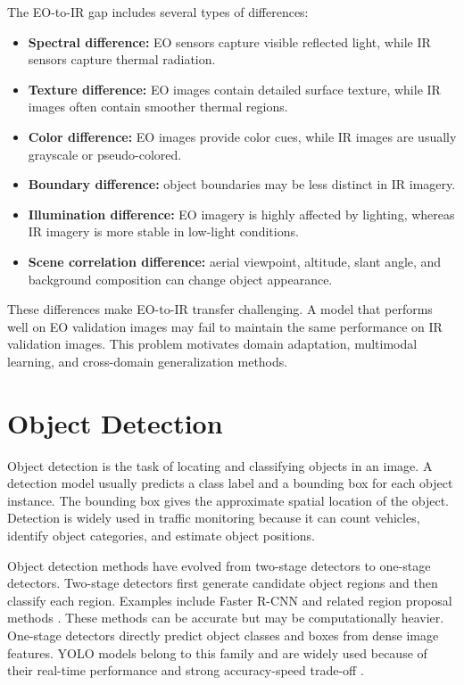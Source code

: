 The EO-to-IR gap includes several types of differences:

\begin{itemize}
    \item \textbf{Spectral difference:} EO sensors capture visible reflected light, while IR sensors capture thermal radiation.
    \item \textbf{Texture difference:} EO images contain detailed surface texture, while IR images often contain smoother thermal regions.
    \item \textbf{Color difference:} EO images provide color cues, while IR images are usually grayscale or pseudo-colored.
    \item \textbf{Boundary difference:} object boundaries may be less distinct in IR imagery.
    \item \textbf{Illumination difference:} EO imagery is highly affected by lighting, whereas IR imagery is more stable in low-light conditions.
    \item \textbf{Scene correlation difference:} aerial viewpoint, altitude, slant angle, and background composition can change object appearance.
\end{itemize}

These differences make EO-to-IR transfer challenging. A model that performs well on EO validation images may fail to maintain the same performance on IR validation images. This problem motivates domain adaptation, multimodal learning, and cross-domain generalization methods.

\section{Object Detection}

Object detection is the task of locating and classifying objects in an image. A detection model usually predicts a class label and a bounding box for each object instance. The bounding box gives the approximate spatial location of the object. Detection is widely used in traffic monitoring because it can count vehicles, identify object categories, and estimate object positions.

Object detection methods have evolved from two-stage detectors to one-stage detectors. Two-stage detectors first generate candidate object regions and then classify each region. Examples include Faster R-CNN and related region proposal methods \cite{fasterrcnn2015}. These methods can be accurate but may be computationally heavier. One-stage detectors directly predict object classes and boxes from dense image features. YOLO models belong to this family and are widely used because of their real-time performance and strong accuracy-speed trade-off \cite{yolo2016,ultralytics2023}.

